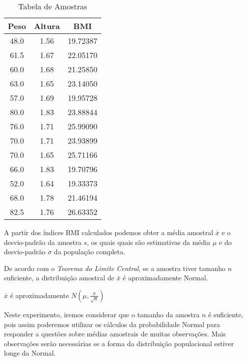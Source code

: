 \documentclass[12pt, a4paper]{article}
\begin{document}
\begin{table}
\centering
\begin{tabular}{|c|c|c|}
\hline
\rule[-1.0ex]{0pt}{4.0ex}
\textbf{Peso}&\textbf{Altura}&\textbf{BMI}\\ \hline
\rule[-1.0ex]{0pt}{4.0ex}
48.0   &	1.56	&	19.72387 \\ \hline
\rule[-1.0ex]{0pt}{4.0ex}
61.5   &	1.67	&	22.05170 \\ \hline
\rule[-1.0ex]{0pt}{4.0ex}
60.0   & 	1.68	&	21.25850 \\ \hline
\rule[-1.0ex]{0pt}{4.0ex}
63.0   &	1.65	&	23.14050 \\ \hline
\rule[-1.0ex]{0pt}{4.0ex}
57.0   &	1.69	&	19.95728 \\ \hline
\rule[-1.0ex]{0pt}{4.0ex}
80.0   &	1.83	&	23.88844 \\ \hline
\rule[-1.0ex]{0pt}{4.0ex}
76.0   &	1.71	&	25.99090 \\ \hline
\rule[-1.0ex]{0pt}{4.0ex}
70.0   &	1.71	&	23.93899 \\ \hline
\rule[-1.0ex]{0pt}{4.0ex}
70.0   &	1.65	&	25.71166 \\ \hline
\rule[-1.0ex]{0pt}{4.0ex}
66.0   &	1.83	&	19.70796 \\ \hline
\rule[-1.0ex]{0pt}{4.0ex}
52.0   &	1.64	&	19.33373 \\ \hline
\rule[-1.0ex]{0pt}{4.0ex}
68.0   &	1.78	&	21.46194 \\ \hline
\rule[-1.0ex]{0pt}{4.0ex}
82.5   &	1.76	&	26.63352 \\ \hline
\end{tabular}
\caption{Tabela de Amostras}
\label{table:amostra}
\end{table}

\par A partir dos índices BMI calculados podemos obter a média amostral $\bar{x}$ e o desvio-padrão da amostra $s$, os quais quais são estimativas da média $\mu$ e do desvio-padrão $\sigma$ da população completa.
\par De acordo com o \textit{Teorema do Limite Central}, se a amostra tiver tamanho $n$ suficiente, a distribuição amostral de $\bar{x}$ é aproximadamente Normal.
\begin{center}
$\bar{x}$ é aproximadamente $N(\mu,\frac{\sigma}{\sqrt{n}})$
\end{center}
\par Neste experimento, iremos considerar que o tamanho da amostra $n$ é suficiente, pois assim poderemos utilizar os cálculos da probabilidade Normal para responder a questões sobre médias amostrais de muitas observações. Mais observações serão necessárias se a forma da distribuição populacional estiver longe da Normal.
\end{document}
